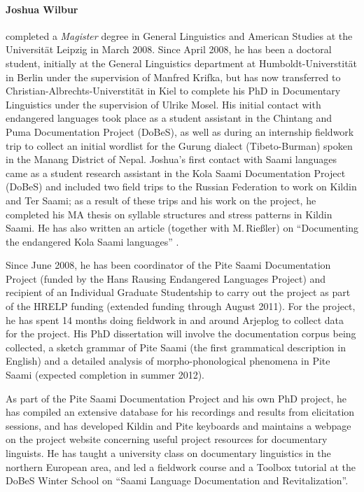 \documentclass[a4paper,12pt]{article}
\begin{document}
{{{{\paragraph{Joshua Wilbur} completed a \textit{Magister} degree in General Linguistics and American Studies at the Universität Leipzig in March 2008. Since April 2008, he has been a doctoral student, initially at the General Linguistics department at Humboldt-Universtität in Berlin under the supervision of Manfred Krifka, but has now transferred to Christian-Albrechts-Universtität in Kiel to complete his PhD in Documentary Linguistics under the supervision of Ulrike Mosel. His initial contact with endangered languages took place as a student assistant in the Chintang and Puma Documentation Project (DoBeS), as well as during an internship fieldwork trip to collect an initial wordlist for the Gurung dialect (Tibeto-Burman) spoken in the Manang District of Nepal. Joshua's first contact with Saami languages came as a student research assistant in the Kola Saami Documentation Project (DoBeS) and included two field trips to the Russian Federation to work on Kildin and Ter Saami; as a result of these trips and his work on the project, he completed his MA thesis on syllable structures and stress patterns in Kildin Saami. He has also written an article (together with M.\,Rießler) on “Documenting the endangered {K}ola {S}aami languages” \citep{riesler-etal2007}.

Since June 2008, he has been coordinator of the Pite Saami Documentation Project (funded by the Hans Rausing Endangered Languages Project) and recipient of an Individual Graduate Studentship to carry out the project as part of the HRELP funding (extended funding through August 2011). For the project, he has spent 14 months doing fieldwork in and around Arjeplog to collect data for the project. His PhD dissertation will involve the documentation corpus being collected, a sketch grammar of Pite Saami (the first grammatical description in English) and a detailed analysis of morpho-phonological phenomena in Pite Saami (expected completion in summer 2012).

As part of the Pite Saami Documentation Project and his own PhD project, he has compiled an extensive database for his recordings and results from elicitation sessions, and has developed Kildin and Pite keyboards and maintains a webpage on the project website concerning useful project resources for documentary linguists. He has taught a university class on documentary linguistics in the northern European area, and led a fieldwork course and a Toolbox tutorial at the DoBeS Winter School on “Saami Language Documentation and Revitalization”.

}}}}
\end{document}
